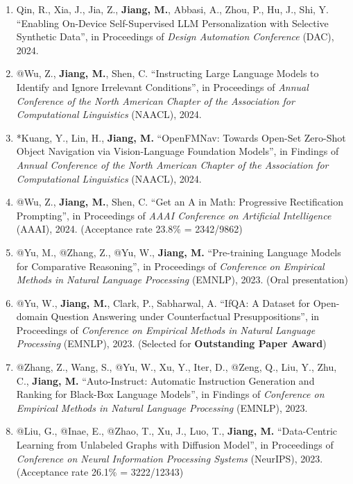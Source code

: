 \documentclass[10pt]{article}
\newenvironment{myindentpar}[1]%
{\begin{list}{}%
         {\setlength{\leftmargin}{#1}}%
         \item[]%
}
{\end{list}}
\newcounter{list}
\begin{document}
\begin{myindentpar}{0.00cm}
\begin{enumerate}[leftmargin=.5cm]
\item[C86] Qin, R., Xia, J., Jia, Z., \textbf{Jiang, M.}, Abbasi, A., Zhou, P., Hu, J., Shi, Y. ``Enabling On-Device Self-Supervised LLM Personalization with Selective Synthetic Data'', in Proceedings of \textit{Design Automation Conference} (DAC), 2024.

\item[C85] @Wu, Z., \textbf{Jiang, M.}, Shen, C. ``Instructing Large Language Models to Identify and Ignore Irrelevant Conditions'', in Proceedings of \textit{Annual Conference of the North American Chapter of the Association for Computational Linguistics} (NAACL), 2024.

\item[C84] *Kuang, Y., Lin, H., \textbf{Jiang, M.} ``OpenFMNav: Towards Open-Set Zero-Shot Object Navigation via Vision-Language Foundation Models'', in Findings of \textit{Annual Conference of the North American Chapter of the Association for Computational Linguistics} (NAACL), 2024.

\item[C83] @Wu, Z., \textbf{Jiang, M.}, Shen, C. ``Get an A in Math: Progressive Rectification Prompting'', in Proceedings of \textit{AAAI Conference on Artificial Intelligence} (AAAI), 2024. (Acceptance rate 23.8\% = 2342/9862)
		
\item[C82] @Yu, M., @Zhang, Z., @Yu, W., \textbf{Jiang, M.} ``Pre-training Language Models for Comparative Reasoning'', in Proceedings of \textit{Conference on Empirical Methods in Natural Language Processing} (EMNLP), 2023. (Oral presentation)

\item[C81] @Yu, W., \textbf{Jiang, M.}, Clark, P., Sabharwal, A. ``IfQA: A Dataset for Open-domain Question Answering under Counterfactual Presuppositions'', in Proceedings of \textit{Conference on Empirical Methods in Natural Language Processing} (EMNLP), 2023. (Selected for \textbf{Outstanding Paper Award})

\item[C80] @Zhang, Z., Wang, S., @Yu, W., Xu, Y., Iter, D., @Zeng, Q., Liu, Y., Zhu, C., \textbf{Jiang, M.} ``Auto-Instruct: Automatic Instruction Generation and Ranking for Black-Box Language Models'', in Findings of \textit{Conference on Empirical Methods in Natural Language Processing} (EMNLP), 2023.

\item[C79] @Liu, G., @Inae, E., @Zhao, T., Xu, J., Luo, T., \textbf{Jiang, M.} ``Data-Centric Learning from Unlabeled Graphs with Diffusion Model'', in Proceedings of \textit{Conference on Neural Information Processing Systems} (NeurIPS), 2023. (Acceptance rate 26.1\% = 3222/12343)


\end{enumerate}
\end{myindentpar}
\end{document}
